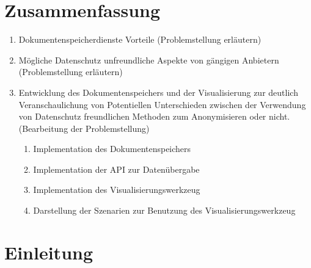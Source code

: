 \documentclass[
    fontsize=12pt,
    headings=small,
    parskip=half,           %
    bibliography=totoc,
    numbers=noenddot,       %
    open=any,               %
    ]{scrreprt}
\begin{document}
\chapter*{Zusammenfassung}
\begin{enumerate}
\item Dokumentenspeicherdienste Vorteile (Problemstellung erläutern)
\item Mögliche Datenschutz unfreundliche Aspekte von gängigen Anbietern (Problemstellung erläutern)
\item Entwicklung des Dokumentenspeichers und der Visualisierung zur deutlich Veranschaulichung von Potentiellen Unterschieden zwischen der Verwendung von Datenschutz freundlichen Methoden zum Anonymisieren oder nicht. (Bearbeitung der Problemstellung)
\begin{enumerate}
\item Implementation des Dokumentenspeichers
\item Implementation der API zur Datenübergabe 
\item Implementation des Visualisierungswerkzeug
\item Darstellung der Szenarien zur Benutzung des Visualisierungswerkzeug
\end{enumerate}
\end{enumerate}

\tableofcontents

\chapter{Einleitung}
\end{document}
